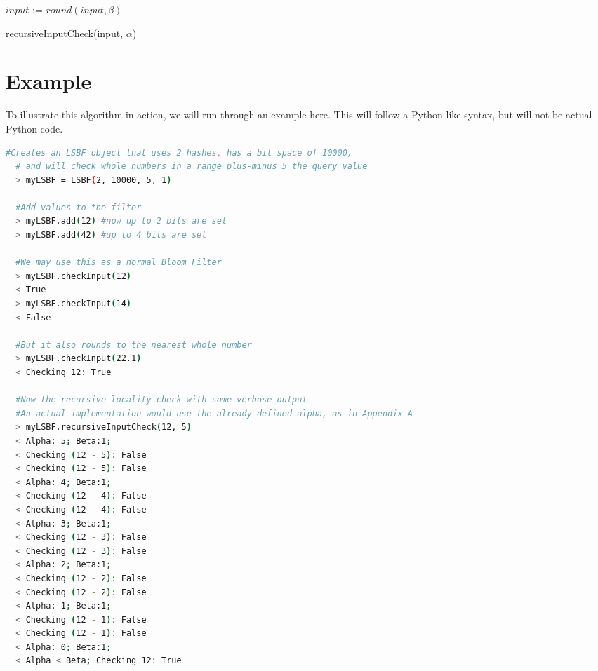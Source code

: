 \begin{algorithm}[H]
	$input$ := $round(input, \beta)$
	
\caption{recursiveInputCheck(input, $\alpha$)}
\end{algorithm}

\section{Example}

To illustrate this algorithm in action, we will run through an example here. This will follow a Python-like syntax, but will not be actual Python code.

\begin{lstlisting}[language=bash]
  #Creates an LSBF object that uses 2 hashes, has a bit space of 10000,
  # and will check whole numbers in a range plus-minus 5 the query value
  > myLSBF = LSBF(2, 10000, 5, 1)
  
  #Add values to the filter
  > myLSBF.add(12) #now up to 2 bits are set
  > myLSBF.add(42) #up to 4 bits are set
  
  #We may use this as a normal Bloom Filter
  > myLSBF.checkInput(12)
  < True
  > myLSBF.checkInput(14)
  < False
  
  #But it also rounds to the nearest whole number
  > myLSBF.checkInput(22.1)
  < Checking 12: True
  
  #Now the recursive locality check with some verbose output
  #An actual implementation would use the already defined alpha, as in Appendix A
  > myLSBF.recursiveInputCheck(12, 5)
  < Alpha: 5; Beta:1;
  < Checking (12 - 5): False
  < Checking (12 - 5): False
  < Alpha: 4; Beta:1;
  < Checking (12 - 4): False
  < Checking (12 - 4): False
  < Alpha: 3; Beta:1;
  < Checking (12 - 3): False
  < Checking (12 - 3): False
  < Alpha: 2; Beta:1;
  < Checking (12 - 2): False
  < Checking (12 - 2): False
  < Alpha: 1; Beta:1;
  < Checking (12 - 1): False
  < Checking (12 - 1): False
  < Alpha: 0; Beta:1;
  < Alpha < Beta; Checking 12: True
  
  
\end{lstlisting}
